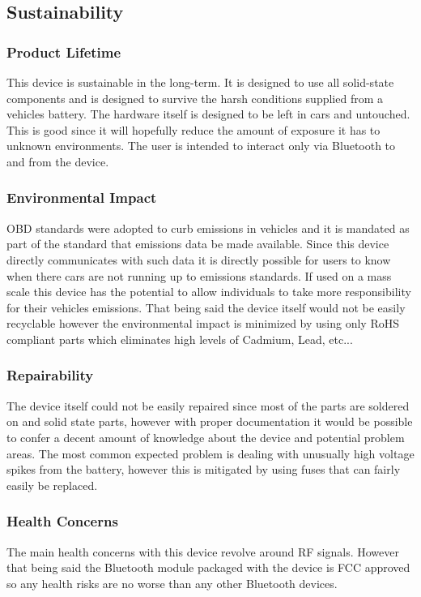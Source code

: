 \documentclass[12pt,letterpaper]{article}
\begin{document}
\subsection{Sustainability}
\subsubsection{Product Lifetime}
This device is sustainable in the long-term. It is designed to use all solid-state components and is designed to survive the harsh conditions supplied from a vehicles battery. The hardware itself is designed to be left in cars and untouched. This is good since it will hopefully reduce the amount of exposure it has to unknown environments. The user is intended to interact only via Bluetooth to and from the device. 

\subsubsection{Environmental Impact}
OBD standards were adopted to curb emissions in vehicles and it is mandated as part of the standard that emissions data be made available. Since this device directly communicates with such data it is directly possible for users to know when there cars are not running up to emissions standards. If used on a mass scale this device has the potential to allow individuals to take more responsibility for their vehicles emissions. That being said the device itself would not be easily recyclable however the environmental impact is minimized by using only RoHS compliant parts which eliminates high levels of Cadmium, Lead, etc...

\subsubsection{Repairability}
The device itself could not be easily repaired since most of the parts are soldered on and solid state parts, however with proper documentation it would be possible to confer a decent amount of knowledge about the device and potential problem areas. The most common expected problem is dealing with unusually high voltage spikes from the battery, however this is mitigated by using fuses that can fairly easily be replaced.

\subsubsection{Health Concerns}
The main health concerns with this device revolve around RF signals. However that being said the Bluetooth module packaged with the device is FCC approved so any health risks are no worse than any other Bluetooth devices.
\end{document}
